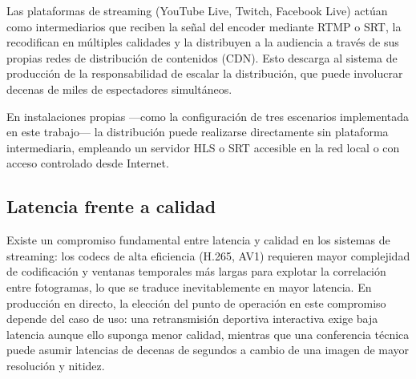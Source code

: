 Las plataformas de streaming (YouTube Live, Twitch, Facebook Live) actúan como
intermediarios que reciben la señal del encoder mediante RTMP o SRT, la recodifican
en múltiples calidades y la distribuyen a la audiencia a través de sus propias redes
de distribución de contenidos (CDN). Esto descarga al sistema de producción de la
responsabilidad de escalar la distribución, que puede involucrar decenas de miles de
espectadores simultáneos.

En instalaciones propias ---como la configuración de tres escenarios implementada en
este trabajo--- la distribución puede realizarse directamente sin plataforma
intermediaria, empleando un servidor HLS o SRT accesible en la red local o con
acceso controlado desde Internet.

\subsection{Latencia frente a calidad}

Existe un compromiso fundamental entre latencia y calidad en los sistemas de
streaming: los codecs de alta eficiencia (H.265, AV1) requieren mayor complejidad
de codificación y ventanas temporales más largas para explotar la correlación entre
fotogramas, lo que se traduce inevitablemente en mayor latencia. En producción en
directo, la elección del punto de operación en este compromiso depende del caso de uso:
una retransmisión deportiva interactiva exige baja latencia aunque ello suponga menor
calidad, mientras que una conferencia técnica puede asumir latencias de decenas de
segundos a cambio de una imagen de mayor resolución y nitidez.
